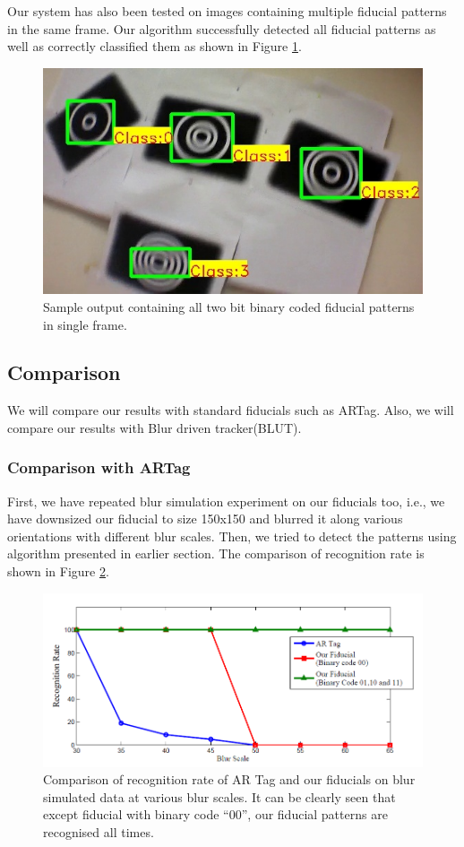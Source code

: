 \documentclass[runningheads]{llncs}
\begin{document}
Our system has also been tested on images containing multiple fiducial patterns
in the same frame. Our algorithm successfully detected all fiducial patterns as
well as correctly classified them as shown in Figure \ref{fig:output_all}.

\begin{figure}
\centering
  \includegraphics[width=.8\linewidth]{output_all_2.jpg}
  \caption{Sample output containing all two bit binary coded fiducial patterns
  in single frame.}
  \label{fig:output_all}
\end{figure}

\subsection{Comparison}
We will compare our results with standard fiducials such as ARTag. Also, we will
compare our results with Blur driven tracker(BLUT)\cite{Wu:2011}.
\subsubsection{Comparison with ARTag}
First, we have repeated blur simulation experiment on our fiducials too, i.e.,
we have downsized our fiducial to size 150x150 and blurred it along various
orientations with different blur scales. Then, we tried to detect the patterns
using algorithm presented in earlier section. The comparison of recognition
rate is shown in Figure \ref{fig:recognition_rate}.

\begin{figure}[h!]
\centering
\includegraphics[width=\linewidth]{recognition_rate.png}
\caption{Comparison of recognition rate of AR Tag and our fiducials on
blur simulated data at various blur scales. It can be clearly seen that except
fiducial with binary code ``00'', our fiducial patterns are
recognised all times.}
\label{fig:recognition_rate}
\end{figure}
\end{document}
